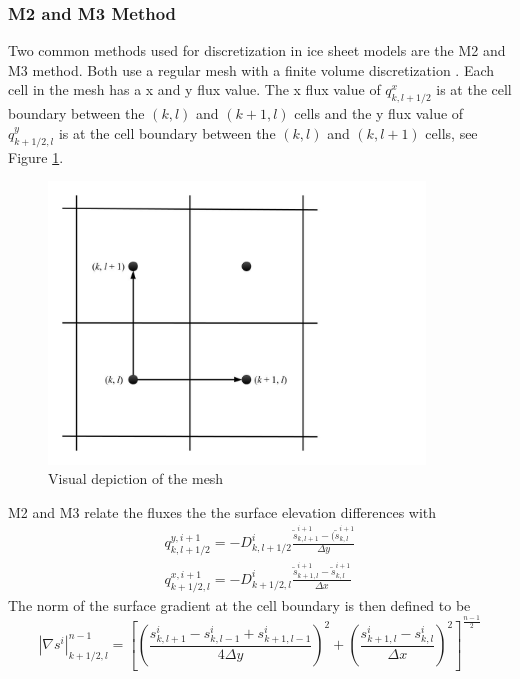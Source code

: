 \documentclass{article}
\begin{document}
\subsubsection{M2 and M3 Method}
Two common methods used for discretization in ice sheet models are the M2 and M3 method. Both use a regular mesh with a finite volume discretization \cite{Jarosch2013,Hindmarsh1996,Huybrechts1996}.  Each cell in the mesh has a x and y flux value. The x flux value of $q^x_{k, l+1/2}$  is at the cell boundary between the $(k,l)$ and $(k+1,l) $ cells and the y flux value of $q^y_{k+1/2, l}$ is at the cell boundary between the $(k,l)$ and $(k,l+1)$ cells, see Figure \ref{fig:Grid}. 
\begin{figure}[H]
    \centering
    \includegraphics[width=10cm]{Grid.jpg}
    \caption{Visual depiction of the mesh}
    \label{fig:Grid}
\end{figure}
M2 and M3 relate the fluxes the the surface elevation differences with
\begin{subequations}
\begin{gather}
    q^{y, i+1}_{k, l+1/2}=-D^i_{k, l+1/2}\frac{\tilde{s}^{i+1}_{k, l+1}-(\tilde{s}^{i+1}_{k, l}}{\Delta y} \\
    q^{x, i+1}_{k+1/2, l}=-D^i_{k+1/2, l}\frac{\tilde{s}^{i+1}_{k+1, l}-\tilde{s}^{i+1}_{k, l}}{\Delta x}
\end{gather}
\end{subequations}
The norm of the surface gradient at the cell boundary is then defined to be 
\begin{equation}
    |\nabla s ^i|^{n-1}_{k+1/2,l} = \left[\left( \frac{s^i_{k,l+1}-s^i_{k,l-1}+s^i_{k+1,l-1}}{4\Delta y}\right)^2+\left( \frac{s^i_{k+1,l}-s^i_{k,l}}{\Delta x}\right)^2 \right]^{\frac{n-1}{2}}
\end{equation}
\end{document}
